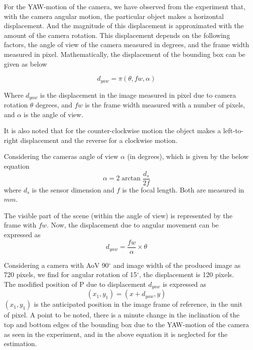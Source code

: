 For the YAW-motion of the camera, we have observed from the experiment that, with the camera angular motion, the particular object makes a horizontal displacement. And the magnitude of this displacement is approximated with the amount of the camera rotation. This displacement depends on the following factors, the angle of view of the camera measured in degrees, and the frame width measured in pixel. Mathematically, the displacement of the bounding box can be given as below

\begin{equation} \label{yaw-displacement}
{d_{yaw}} = \pi({\theta , fw, \alpha})
\end{equation}

Where ${d_{yaw}}$ is the displacement in the image measured in pixel due to camera rotation ${\theta}$ degrees, and $fw$ is the frame width measured with a number of pixels, and $\alpha$ is the angle of view.

It is also noted that for the counter-clockwise motion the object makes a left-to-right displacement and the reverse for a clockwise motion. 

Considering the cameras angle of view $\alpha$ (in degrees), which is given by the below equation
\begin{equation} \label{angle-of-view}
\alpha =2\arctan {\frac {d_s}{2f}}
\end{equation}
where ${d_s}$ is the sensor dimension and $f$ is the focal length. Both are measured in $mm$.

The visible part of the scene (within the angle of view) is represented by the frame with $fw$. Now, the displacement due to angular movement can be expressed as
\begin{equation} \label{yaw-displacement-detail}
{d_{yaw}} = \frac {fw}{\alpha} \times {\theta}
\end{equation}

Considering a camera with AoV 90$^{\circ}$ and image width of the produced image as 720 pixels, we find for angular rotation of 15$^{\circ}$, the displacement is 120 pixels. \\
 
The modified position of P due to displacement ${d_{yaw}}$ is expressed as
\begin{equation} \label{new-xy}
(x_1, y_1) = (x + d_{yaw}, y)
\end{equation}
$(x_1, y_1)$ is the anticipated position in the image frame of reference, in the unit of pixel.
A point to be noted, there is a minute change in the inclination of the top and bottom edges of the bounding box due to the YAW-motion of the camera as seen in the experiment, and in the above equation it is neglected for the estimation.

